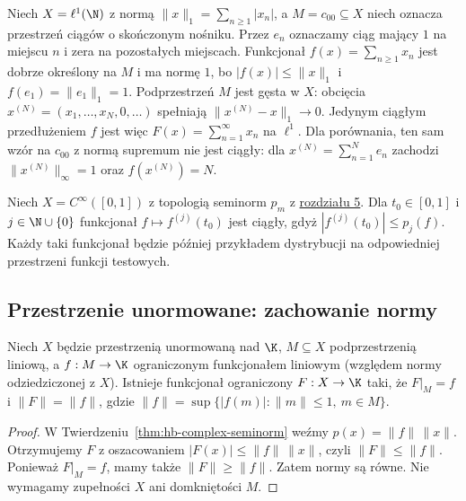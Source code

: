 \begin{przyklad}
Niech $X=\ell^1(\N)$ z normą
$\|x\|_1=\sum_{n\ge1}|x_n|$, a $M=c_{00}\subseteq X$
niech oznacza przestrzeń ciągów o skończonym nośniku.
Przez $e_n$ oznaczamy ciąg mający $1$ na miejscu $n$
i zera na pozostałych miejscach. Funkcjonał $f(x)=\sum_{n\ge1}x_n$ jest dobrze określony
na $M$ i ma normę $1$, bo $|f(x)|\le\|x\|_1$
i $f(e_1)=\|e_1\|_1=1$. Podprzestrzeń $M$ jest gęsta
w $X$: obcięcia $x^{(N)}=(x_1,\ldots,x_N,0,\ldots)$
spełniają $\|x^{(N)}-x\|_1\to0$. Jedynym ciągłym
przedłużeniem $f$ jest więc
$F(x)=\sum_{n=1}^\infty x_n$ na $\ell^1$.
Dla porównania, ten sam wzór na $c_{00}$ z normą
supremum nie jest ciągły: dla
$x^{(N)}=\sum_{n=1}^N e_n$ zachodzi
$\|x^{(N)}\|_\infty=1$ oraz $f(x^{(N)})=N$.
\end{przyklad}

\begin{przyklad}
Niech $X=C^\infty([0,1])$ z topologią seminorm
$p_m$ z \hyperref[sec:lokalnie-wypukle]{rozdziału 5}. Dla $t_0\in[0,1]$ i
$j\in\N\cup\{0\}$ funkcjonał
$f\mapsto f^{(j)}(t_0)$ jest ciągły, gdyż
$|f^{(j)}(t_0)|\le p_j(f)$. Każdy taki funkcjonał
będzie później przykładem dystrybucji na odpowiedniej
przestrzeni funkcji testowych.
\end{przyklad}

\subsection{Przestrzenie unormowane: zachowanie normy}

\begin{twierdzenie}
\label{thm:hb-normed}
Niech $X$ będzie przestrzenią unormowaną nad $\K$,
$M\subseteq X$ podprzestrzenią liniową, a
$f:M\to\K$ ograniczonym funkcjonałem liniowym
(względem normy odziedziczonej z $X$).
Istnieje funkcjonał ograniczony $F:X\to\K$ taki, że
$F|_M=f$ i $\|F\|=\|f\|$, gdzie
$\|f\|=\sup\{|f(m)|:\|m\|\le1,\ m\in M\}$.
\end{twierdzenie}
\begin{proof}
W Twierdzeniu~\ref{thm:hb-complex-seminorm}
weźmy $p(x)=\|f\|\,\|x\|$. Otrzymujemy $F$
z oszacowaniem $|F(x)|\le\|f\|\,\|x\|$,
czyli $\|F\|\le\|f\|$. Ponieważ $F|_M=f$,
mamy także $\|F\|\ge\|f\|$. Zatem normy są równe.
Nie wymagamy zupełności $X$ ani domkniętości $M$.
\end{proof}

